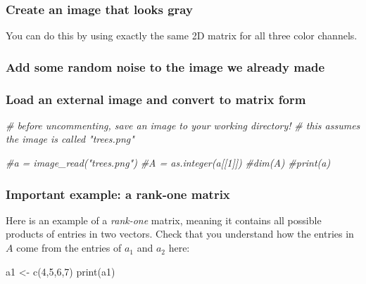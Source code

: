 \documentclass[
]{article}
\newenvironment{Shaded}{\begin{snugshade}}{\end{snugshade}}
\newcommand{\CommentTok}[1]{\textcolor[rgb]{0.56,0.35,0.01}{\textit{#1}}}
\newcommand{\DecValTok}[1]{\textcolor[rgb]{0.00,0.00,0.81}{#1}}
\newcommand{\FunctionTok}[1]{\textcolor[rgb]{0.00,0.00,0.00}{#1}}
\newcommand{\NormalTok}[1]{#1}
\newcommand{\OtherTok}[1]{\textcolor[rgb]{0.56,0.35,0.01}{#1}}
\begin{document}
\hypertarget{create-an-image-that-looks-gray}{%
\subsubsection{Create an image that looks
gray}\label{create-an-image-that-looks-gray}}

You can do this by using exactly the same 2D matrix for all three color
channels.

\hypertarget{add-some-random-noise-to-the-image-we-already-made}{%
\subsubsection{Add some random noise to the image we already
made}\label{add-some-random-noise-to-the-image-we-already-made}}

\hypertarget{load-an-external-image-and-convert-to-matrix-form}{%
\subsubsection{Load an external image and convert to matrix
form}\label{load-an-external-image-and-convert-to-matrix-form}}

\begin{Shaded}
\begin{Highlighting}[]
\CommentTok{\# before uncommenting, save an image to your working directory! }
\CommentTok{\# this assumes the image is called "trees.png"}

\CommentTok{\#a = image\_read("trees.png")}
\CommentTok{\#A = as.integer(a[[1]])}
\CommentTok{\#dim(A)}
\CommentTok{\#print(a)}
\end{Highlighting}
\end{Shaded}

\hypertarget{important-example-a-rank-one-matrix}{%
\subsubsection{Important example: a rank-one
matrix}\label{important-example-a-rank-one-matrix}}

Here is an example of a \emph{rank-one} matrix, meaning it contains all
possible products of entries in two vectors. Check that you understand
how the entries in \(A\) come from the entries of \(a_1\) and \(a_2\)
here:

\begin{Shaded}
\begin{Highlighting}[]
\NormalTok{a1 }\OtherTok{\textless{}{-}} \FunctionTok{c}\NormalTok{(}\DecValTok{4}\NormalTok{,}\DecValTok{5}\NormalTok{,}\DecValTok{6}\NormalTok{,}\DecValTok{7}\NormalTok{)}
\FunctionTok{print}\NormalTok{(a1)}
\end{Highlighting}
\end{Shaded}
\end{document}
